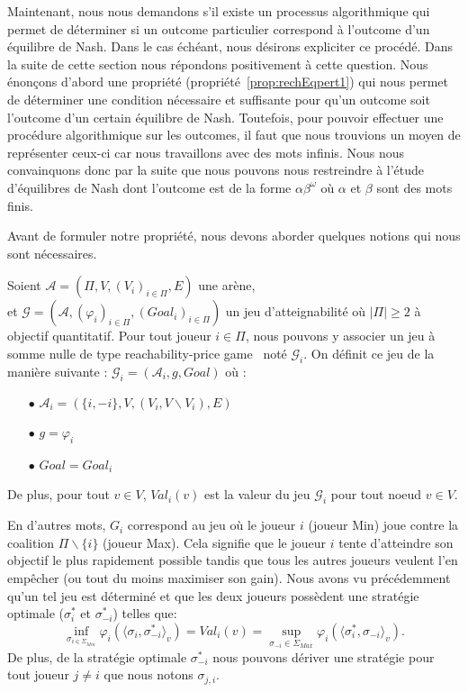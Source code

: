 

Maintenant, nous nous demandons s'il existe un processus algorithmique qui permet de déterminer si un outcome particulier correspond à l'outcome d'un équilibre de Nash. Dans le cas échéant, nous désirons expliciter ce procédé. Dans la suite de cette section nous répondons positivement à cette question. Nous énonçons d'abord une propriété (propriété~\ref{prop:rechEqpert1}) qui nous permet de déterminer une condition nécessaire et suffisante pour qu'un outcome soit l'outcome d'un certain équilibre de Nash. Toutefois, pour pouvoir effectuer une procédure algorithmique sur les outcomes, il faut que nous trouvions un moyen de représenter ceux-ci car nous travaillons avec des mots infinis. Nous nous convainquons donc par la suite que nous pouvons nous restreindre à l'étude d'équilibres de Nash dont l'outcome est de la forme $\alpha \beta^{\omega}$ où $\alpha$ et $\beta$ sont des mots finis. 

Avant de formuler notre propriété, nous devons aborder quelques notions qui nous sont nécessaires.


\begin{defi}
	\label{defi:coalGame}
 Soient $\mathcal{A} = (\Pi, V, (V_{i})_{i\in\Pi}, E)$ une arène,\\
et $\mathcal{G} = (\mathcal{A}, (\varphi _{i})_{i\in\Pi}, (Goal_{i})_{i\in\Pi})$ un jeu d'atteignabilité où $|\Pi| \geq 2$ à objectif quantitatif.
Pour tout joueur $i \in \Pi$, nous pouvons y associer un jeu à somme nulle de type \og reachability-price game \fg~noté $\mathcal{G}_{i}$.
On définit ce jeu de la manière suivante : 
$ \displaystyle \mathcal{G}_{i}= (\mathcal{A}_{i}, g , Goal) \text{ où }$:
\begin{itemize}
	\item[$\bullet$] $\mathcal{A}_{i} = (\{i,-i \}, V, (V_{i},V\backslash V_i),E)$
	\item[$\bullet$] $g = \varphi_i$ 
	\item[$\bullet$] $Goal = Goal_i$
\end{itemize}

\noindent De plus, pour tout $v\in V$, $Val_i(v)$ est la valeur du jeu $\mathcal{G}_i$ pour tout noeud $v\in V$. 
\end{defi} 

En d'autres mots, $G_i$ correspond au jeu où le joueur $i$ (joueur Min) joue contre la coalition $\Pi\backslash\{ i \}$ (joueur Max). Cela signifie que le joueur $i$ tente d'atteindre son objectif le plus rapidement possible tandis que tous les autres joueurs veulent l'en empêcher (ou tout du moins maximiser son gain). Nous avons vu précédemment qu'un tel jeu est déterminé et que les deux joueurs possèdent une stratégie optimale ($\sigma^*_i$ et $\sigma^*_{-i}$) telles que:
$$ \inf_{\sigma _{i\in \Sigma _{Min}}} \varphi_i(\langle \sigma_i,\sigma^*_{-i}\rangle_v)= Val_i(v) = \sup _{\sigma_{-i}\in \Sigma_{Max}} \varphi_i(\langle \sigma^*_i, \sigma_{-i}\rangle_v).$$ De plus, de la stratégie optimale $\sigma^*_{-i}$ nous pouvons dériver une stratégie pour tout joueur $j \neq i$ que nous notons $\sigma_{j,i}$.\\

